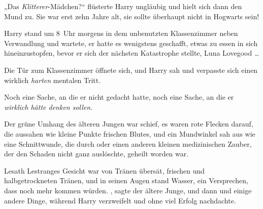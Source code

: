 „Das \emph{Klitterer}-Mädchen?“ flüsterte Harry ungläubig und hielt sich dann den Mund zu. Sie war erst zehn Jahre alt, sie sollte überhaupt nicht in Hogwarts sein!


Harry stand um 8~Uhr morgens in dem unbenutzten Klassenzimmer neben Verwandlung und wartete, er hatte es wenigstens geschafft, etwas zu essen in sich hineinzustopfen, bevor er sich der nächsten Katastrophe stellte, Luna Lovegood …

Die Tür zum Klassenzimmer öffnete sich, und Harry sah und verpasste sich einen wirklich \emph{harten} mentalen Tritt.

Noch eine Sache, an die er nicht gedacht hatte, noch eine Sache, an die er \emph{wirklich hätte denken sollen}.

Der grüne Umhang des älteren Jungen war schief, es waren rote Flecken darauf, die aussahen wie kleine Punkte frischen Blutes, und ein Mundwinkel sah aus wie eine Schnittwunde, die durch  oder einen anderen kleinen medizinischen Zauber, der den Schaden nicht ganz auslöschte, geheilt worden war.

Lesath Lestranges Gesicht war von Tränen übersät, frischen und halbgetrockneten Tränen, und in seinen Augen stand Wasser, ein Versprechen, dass noch mehr kommen würden. , sagte der ältere Junge, und dann  und einige andere Dinge, während Harry verzweifelt und ohne viel Erfolg nachdachte.

